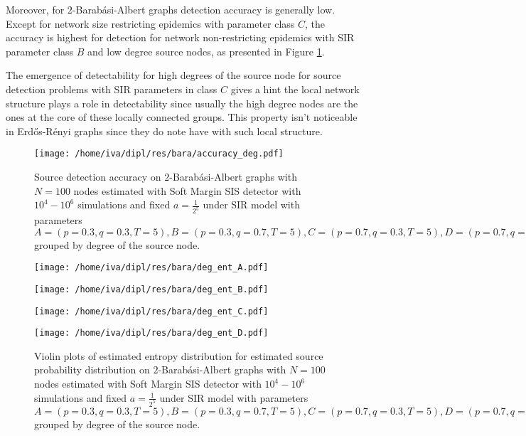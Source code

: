 \documentclass[times, utf8, diplomski]{fer}
\begin{document}
Moreover, for $2$-Barab\'{a}si-Albert graphs detection accuracy is generally low. Except for network size restricting epidemics with parameter class $C$, the accuracy is highest for detection for network non-restricting epidemics with SIR parameter class $B$ and low degree source nodes, as presented in Figure \ref{bara_acc_deg}. 

The emergence of detectability for high degrees of the source node for source detection problems with SIR parameters in class $C$ gives a hint the local network structure plays a role in detectability since usually the high degree nodes are the ones at the core of these locally connected groups. This property isn't noticeable in Erd{\H{o}}s-R{\'{e}}nyi graphs since they do note have with such local  structure. 

\begin{figure}[H]
\begin{minipage}{\textwidth}
\center
\texttt{[image: /home/iva/dipl/res/bara/accuracy\_deg.pdf]}
\caption{Source detection accuracy on  $2$-Barab\'{a}si-Albert graphs  with $N=100$ nodes estimated with Soft Margin SIS detector with $10^4 - 10^6$ simulations and fixed $a = \frac{1}{2^5}$ under SIR model with parameters $A = (p=0.3, q=0.3, T=5), B = (p=0.3, q=0.7, T=5), C = (p=0.7, q=0.3, T=5), D = (p=0.7, q=0.7, T=5)$ grouped by degree of the source node.}
\label{bara_acc_deg}
\end{minipage}
\end{figure}

\begin{figure}[H]
\begin{minipage}{0.49\textwidth}
\texttt{[image: /home/iva/dipl/res/bara/deg\_ent\_A.pdf]}
\end{minipage}
\begin{minipage}{0.49\textwidth}
\texttt{[image: /home/iva/dipl/res/bara/deg\_ent\_B.pdf]}
\end{minipage}

\begin{minipage}{0.49\textwidth}
\texttt{[image: /home/iva/dipl/res/bara/deg\_ent\_C.pdf]}
\end{minipage}
\begin{minipage}{0.49\textwidth}
\texttt{[image: /home/iva/dipl/res/bara/deg\_ent\_D.pdf]}
\end{minipage}
\caption{Violin plots of estimated entropy distribution for estimated source probability distribution on  $2$-Barab\'{a}si-Albert graphs  with $N=100$ nodes estimated with Soft Margin SIS detector with $10^4 - 10^6$ simulations and fixed $a = \frac{1}{2^5}$ under SIR model with parameters $A = (p=0.3, q=0.3, T=5), B = (p=0.3, q=0.7, T=5), C = (p=0.7, q=0.3, T=5), D = (p=0.7, q=0.7, T=5)$ grouped by degree of the source node.}
\label{bara_deg_ent}
\end{figure}
\end{document}
